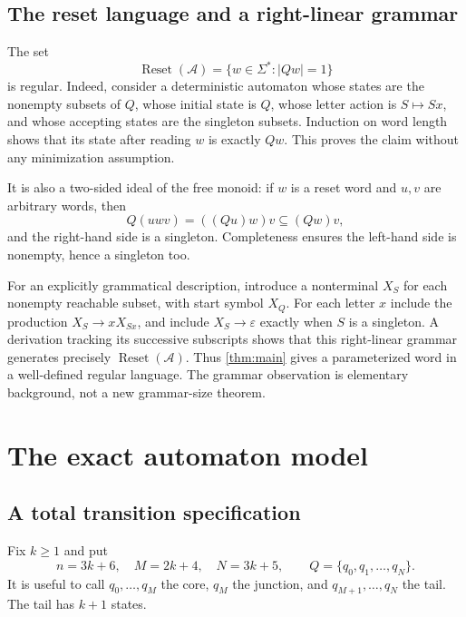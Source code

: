 \documentclass[11pt,a4paper]{article}
\numberwithin{equation}{section}
\theoremstyle{definition}
\theoremstyle{remark}
\newcommand{\ResetLang}{\operatorname{Reset}}
\newcommand{\eps}{\varepsilon}
\begin{document}
\subsection{The reset language and a right-linear grammar}

The set
\[
 \ResetLang(\mathcal A)=\{w\in\Sigma^*:|Qw|=1\}
\]
is regular. Indeed, consider a deterministic automaton whose states are the
nonempty subsets of $Q$, whose initial state is $Q$, whose letter action is
$S\mapsto Sx$, and whose accepting states are the singleton subsets.
Induction on word length shows that its state after reading $w$ is exactly
$Qw$. This proves the claim without any minimization assumption.

It is also a two-sided ideal of the free monoid: if $w$ is a reset word and
$u,v$ are arbitrary words, then
\[
 Q(uwv)=((Qu)w)v\subseteq(Qw)v,
\]
and the right-hand side is a singleton. Completeness ensures the left-hand
side is nonempty, hence a singleton too.

For an explicitly grammatical description, introduce a nonterminal $X_S$
for each nonempty reachable subset, with start symbol $X_Q$. For each letter
$x$ include the production $X_S\to xX_{Sx}$, and include $X_S\to\eps$ exactly
when $S$ is a singleton. A derivation tracking its successive subscripts
shows that this right-linear grammar generates precisely
$\ResetLang(\mathcal A)$. Thus \cref{thm:main} gives a parameterized word in a
well-defined regular language. The grammar observation is elementary
background, not a new grammar-size theorem.

\section{The exact automaton model}
\label{sec:model}

\subsection{A total transition specification}

Fix $k\geq1$ and put
\begin{equation}\label{eq:parameters}
 n=3k+6,\quad M=2k+4,\quad N=3k+5,
 \qquad Q=\{q_0,q_1,\ldots,q_N\}.
\end{equation}
It is useful to call $q_0,\ldots,q_M$ the core, $q_M$ the junction, and
$q_{M+1},\ldots,q_N$ the tail. The tail has $k+1$ states.
\end{document}
